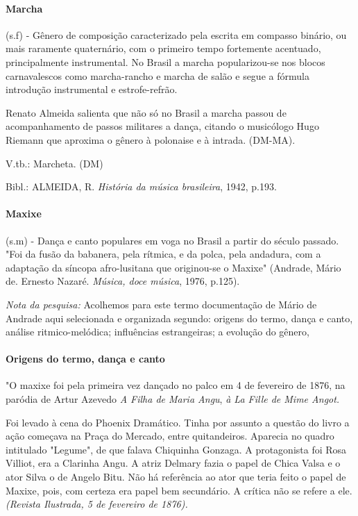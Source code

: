 \paragraph{Marcha} (s.f) - Gênero de composição caracterizado pela escrita
em compasso binário, ou mais raramente quaternário, com o primeiro tempo
fortemente acentuado, principalmente instrumental. No Brasil a marcha
popularizou-se nos blocos carnavalescos como marcha-rancho e marcha de
salão e segue a fórmula introdução instrumental e estrofe-refrão.

Renato Almeida salienta que não só no Brasil a marcha passou de
acompanhamento de passos militares a dança, citando o musicólogo Hugo
Riemann que aproxima o gênero à polonaise e à intrada. (DM-MA).

V.tb.: Marcheta. (DM)

Bibl.: ALMEIDA, R. \emph{História da música brasileira}, 1942, p.193.

\paragraph{Maxixe} (s.m) - Dança e canto populares em voga no Brasil a
partir do século passado. "Foi da fusão da babanera, pela rítmica, e da
polca, pela andadura, com a adaptação da síncopa afro-lusitana que
originou-se o Maxixe" (Andrade, Mário de. Ernesto Nazaré. \emph{Música,
doce música}, 1976, p.125).

\emph{Nota da pesquisa:} Acolhemos para este termo documentação de Mário
de Andrade aqui selecionada e organizada segundo: origens do termo,
dança e canto, análise ritmico-melódica; influências estrangeiras; a
evolução do gênero,

\paragraph{Origens do termo, dança e canto}

"O maxixe foi pela primeira vez dançado no palco em 4 de fevereiro de
1876, na paródia de Artur Azevedo \emph{A Filha de Maria Angu}, \emph{à
La Fille de Mime Angot.}

Foi levado à cena do Phoenix Dramático. Tinha por assunto a questão do
livro a ação começava na Praça do Mercado, entre quitandeiros. Aparecia
no quadro intitulado "Legume", de que falava Chiquinha Gonzaga. A
protagonista foi Rosa Villiot, era a Clarinha Angu. A atriz Delmary
fazia o papel de Chica Valsa e o ator Silva o de Angelo Bitu. Não há
referência ao ator que teria feito o papel de Maxixe, pois, com certeza
era papel bem secundário. A crítica não se refere a ele. \emph{(Revista
Ilustrada, 5 de fevereiro de 1876).}

